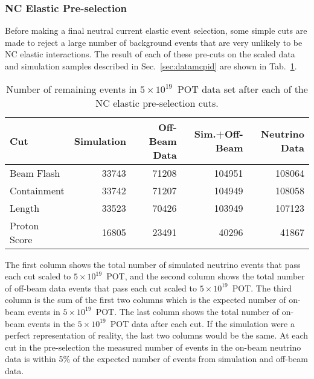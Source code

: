   \subsubsection{NC Elastic Pre-selection}
    Before making a final neutral current elastic event selection, some simple
    cuts are made to reject a large number of background events that are very
    unlikely to be NC elastic interactions. The result of each of these
    pre-cuts on the scaled data and simulation samples described in
    Sec.~\ref{sec:datamcpid} are shown in Tab.~\ref{tab:preseldatamc}. 
    \begin{table}
      \caption{Number of remaining events in $5\times 10^{19}$~POT data set
      after each of the NC elastic pre-selection cuts.
      \label{tab:preseldatamc}}
      \begin{tabularx}{\textwidth}{l r r  r r}
        \hline
        Cut & Simulation & Off-Beam Data & Sim.+Off-Beam & Neutrino Data \\
        \hline
        Beam Flash & 33743 & 71208 & 104951 & 108064 \\
        Containment & 33742 & 71207 & 104949 & 108058 \\
        Length & 33523 & 70426 & 103949 & 107123 \\
        Proton Score & 16805 & 23491 & 40296 & 41867 \\
        \hline
      \end{tabularx}
    \end{table}
    The first column shows the total number of simulated neutrino events that
    pass each cut scaled to $5\times 10^{19}$~POT, and the second column shows
    the total number of off-beam data events that pass each cut scaled to
    $5\times 10^{19}$~POT. The third column is the sum of the first two columns
    which is the expected number of on-beam events in $5\times 10^{19}$~POT.
    The last column shows the total number of on-beam events in the $5\times
    10^{19}$~POT data after each cut. If the simulation were a perfect
    representation of reality, the last two columns would be the same. At each
    cut in the pre-selection the measured number of events in the on-beam
    neutrino data is within 5\% of the expected number of events from
    simulation and off-beam data.

